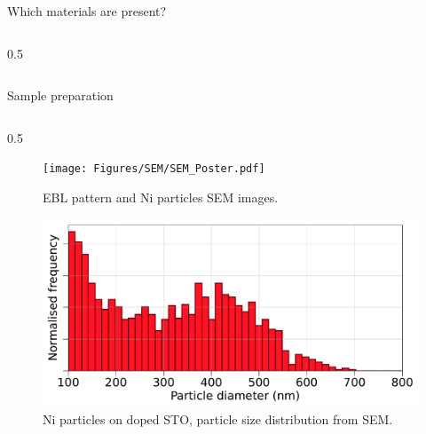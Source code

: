 \documentclass[final]{beamer}
\newlength{\colwidth}
\begin{document}
\begin{frame}[t]
\begin{columns}[t]
\begin{column}{\colwidth}
\begin{block}{Which materials are present?}
\begin{columns}[T]
\begin{column}{0.5\colwidth}
            
            \end{column}
        \end{columns}
        
    \end{block}

    \vspace{-1cm}

    \begin{block}{Sample preparation}

        \begin{columns}[T]
            \begin{column}{0.5\colwidth}
                \begin{figure}
                    \centering
                    \texttt{[image: Figures/SEM/SEM\_Poster.pdf]}
                    \caption{EBL pattern and Ni particles SEM images.}
                    \label{fig:EBLPattern}
                \end{figure}

                \begin{figure}
                    \centering
                    \includegraphics[width=0.475\colwidth]{Figures/ClusterDiameterHist.pdf}
                    \caption{Ni particles on doped STO, particle size distribution from SEM.}
                    \label{fig:Hist}
                \end{figure}
                
            \end{column}
            

\end{columns}
\end{block}
\end{column}
\end{columns}
\end{frame}
\end{document}
